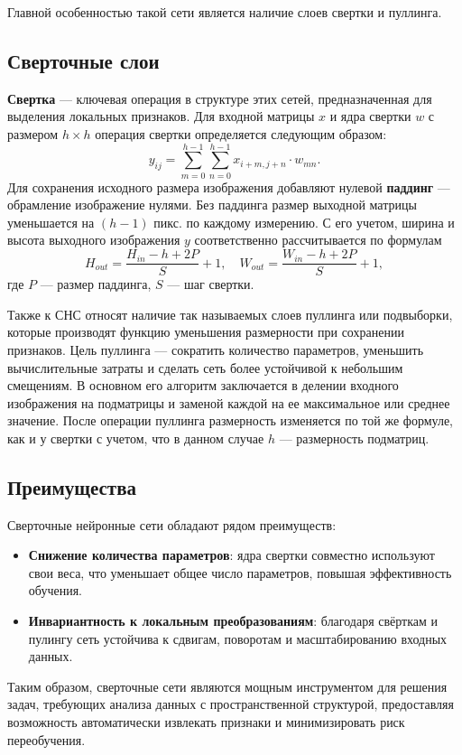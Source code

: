 \documentclass[12pt, a4paper]{article}
\begin{document}
Главной особенностью такой сети является наличие слоев свертки и пуллинга.

\subsection{Сверточные слои}

\textbf{Свертка} — ключевая операция в структуре этих сетей, предназначенная для выделения локальных признаков. Для входной матрицы \(x\) и ядра свертки \(w\) с размером \(h \times h\) операция свертки определяется следующим образом:
\[
y_{ij} = \sum_{m=0}^{h-1} \sum_{n=0}^{h-1} x_{i+m, j+n} \cdot w_{mn}.
\]
Для сохранения исходного размера изображения добавляют нулевой \textbf{паддинг} --- обрамление изображение нулями.  Без паддинга размер выходной матрицы уменьшается на $(h - 1)$ пикс. по каждому измерению. С его учетом, ширина и высота выходного изображения \(y\) соответственно рассчитывается по формулам
\[
H_{out} = \frac{H_{in} - h + 2P}{S} + 1, \quad W_{out} = \frac{W_{in} - h + 2P}{S} + 1,
\]
где \(P\) — размер паддинга, \(S\) — шаг свертки.

Также к СНС относят наличие так называемых слоев пуллинга или подвыборки, которые производят функцию уменьшения размерности при сохранении признаков. Цель пуллинга — сократить количество параметров, уменьшить вычислительные затраты и сделать сеть более устойчивой к небольшим смещениям. В основном его алгоритм заключается в делении входного изображения на подматрицы и заменой каждой на ее максимальное или среднее значение. После операции пуллинга размерность изменяется по той же формуле, как и у свертки с учетом, что в данном случае $h$ --- размерность подматриц. 

\newpage
\subsection{Преимущества}
Сверточные нейронные сети обладают рядом преимуществ:
\begin{itemize}
	\item \textbf{Снижение количества параметров}: ядра свертки совместно используют свои веса, что уменьшает общее число параметров, повышая эффективность обучения.
	\item \textbf{Инвариантность к локальным преобразованиям}: благодаря свёрткам и пулингу сеть устойчива к сдвигам, поворотам и масштабированию входных данных.
\end{itemize}

Таким образом, сверточные сети являются мощным инструментом для решения задач, требующих анализа данных с пространственной структурой, предоставляя возможность автоматически извлекать признаки и минимизировать риск переобучения.
\end{document}
